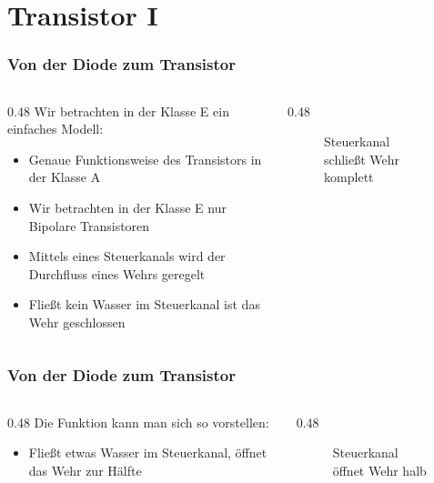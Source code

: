 
\section{Transistor I}
\label{section:transistor_1}
\begin{frame}%

\frametitle{Von der Diode zum Transistor}
\begin{columns}
    \begin{column}{0.48\textwidth}
        Wir betrachten in der Klasse E ein einfaches Modell:
    \begin{itemize}
        \item Genaue Funktionsweise des Transistors in der Klasse A
        \item Wir betrachten in der Klasse E nur Bipolare Transistoren
        \item Mittels eines Steuerkanals wird der Durchfluss eines Wehrs geregelt
        \item Fließt kein Wasser im Steuerkanal ist das Wehr geschlossen
    \end{itemize}
    \end{column}
    \begin{column}{0.48\textwidth}
        \begin{figure}
            \caption{\scriptsize Steuerkanal schließt Wehr komplett}
            \label{e_transistor_wehr_geschlossen}
        \end{figure}
   \end{column}
\end{columns}

\end{frame}

\begin{frame}
\frametitle{Von der Diode zum Transistor}
\begin{columns}
    \begin{column}{0.48\textwidth}
    Die Funktion kann man sich so vorstellen:

\begin{itemize}
  \item Fließt etwas Wasser im Steuerkanal, öffnet das Wehr zur Hälfte
  \end{itemize}

    \end{column}
   \begin{column}{0.48\textwidth}
       
\begin{figure}
    \caption{\scriptsize Steuerkanal öffnet Wehr halb}
    \label{e_transistor_wehr_halb_offen}
\end{figure}


   \end{column}
\end{columns}

\end{frame}


